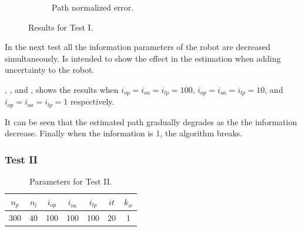 {\begin{figure}[htbp!]
\begin{subfigure}[b]{\errorWidth\textwidth}
\caption{Path normalized error.}
\label{fig:test-ib}
\end{subfigure}
\caption{Results for Test I.}
\label{fig:test-i}
\end{figure}
}

In the next test all the information parameters of the robot are decreased simultaneously. Is intended to show the effect in the estimation when adding uncertainty to the robot.

, , and , shows the results when $i_{op}=i_{oa}=i_{lp}=100$, $i_{op}=i_{oa}=i_{lp}=10$, and $i_{op}=i_{oa}=i_{lp}=1$ respectively.


It can be seen that the estimated path gradually degrades as the the information decrease. Finally when the information is 1, the algorithm breaks.

\subsubsection{Test II}
\label{sec:test-ii}

\begin{table}[htbp!]
    \centering
    \begin{tabular}{|c|c|c|c|c|c|c|}
        \hline
        $n_p$ & $n_l$ & $i_{op}$ & $i_{oa}$ & $i_{lp}$ & $it$ & $k_w$\\
        \hline \hline
        300 & 40 & 100 & 100 & 100 & 20 & 1\\
        \hline 
    \end{tabular}
    \caption{Parameters for Test II.}
    \label{tab:test-ii}
\end{table}

